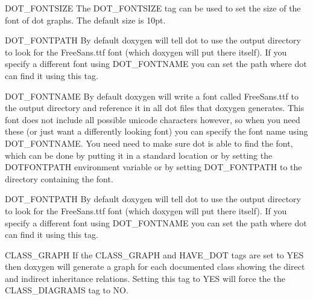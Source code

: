 \begin{DoxyDescription}
\label{config_cfg_dot_fontsize}
\hypertarget{config_cfg_dot_fontsize}{}
 
\item[{\ttfamily DOT\_\-FONTSIZE} ]The {\ttfamily DOT\_\-FONTSIZE} tag can be used to set the size of the font of dot graphs. The default size is 10pt.

\label{config_cfg_dot_fontpath}
\hypertarget{config_cfg_dot_fontpath}{}
 
\item[{\ttfamily DOT\_\-FONTPATH} ] By default doxygen will tell dot to use the output directory to look for the {\ttfamily FreeSans.ttf} font (which doxygen will put there itself). If you specify a different font using {\ttfamily DOT\_\-FONTNAME} you can set the path where dot can find it using this tag.


\item[{\ttfamily DOT\_\-FONTNAME} ] By default doxygen will write a font called FreeSans.ttf to the output directory and reference it in all dot files that doxygen generates. This font does not include all possible unicode characters however, so when you need these (or just want a differently looking font) you can specify the font name using {\ttfamily DOT\_\-FONTNAME}. You need need to make sure dot is able to find the font, which can be done by putting it in a standard location or by setting the {\ttfamily DOTFONTPATH} environment variable or by setting {\ttfamily DOT\_\-FONTPATH} to the directory containing the font.


\item[{\ttfamily DOT\_\-FONTPATH} ] By default doxygen will tell dot to use the output directory to look for the FreeSans.ttf font (which doxygen will put there itself). If you specify a different font using {\ttfamily DOT\_\-FONTNAME} you can set the path where dot can find it using this tag.

\label{config_cfg_class_graph}
\hypertarget{config_cfg_class_graph}{}
 
\item[{\ttfamily CLASS\_\-GRAPH} ] If the {\ttfamily CLASS\_\-GRAPH} and {\ttfamily HAVE\_\-DOT} tags are set to {\ttfamily YES} then doxygen will generate a graph for each documented class showing the direct and indirect inheritance relations. Setting this tag to {\ttfamily YES} will force the the {\ttfamily CLASS\_\-DIAGRAMS} tag to NO.


\end{DoxyDescription}

